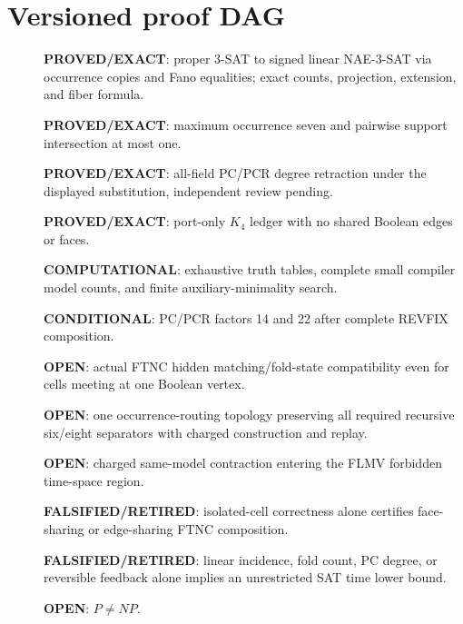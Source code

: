 \documentclass[11pt]{article}
\newcommand{\EXACT}{\textbf{PROVED/EXACT}}
\newcommand{\COMP}{\textbf{COMPUTATIONAL}}
\newcommand{\COND}{\textbf{CONDITIONAL}}
\newcommand{\OPEN}{\textbf{OPEN}}
\newcommand{\RET}{\textbf{FALSIFIED/RETIRED}}
\begin{document}
\section{Versioned proof DAG}
\begin{description}
\item[] \EXACT: proper 3-SAT to signed linear NAE-3-SAT via occurrence copies
and Fano equalities; exact counts, projection, extension, and fiber formula.
\item[] \EXACT: maximum occurrence seven and pairwise support intersection at
most one.
\item[] \EXACT: all-field PC/PCR degree retraction under the displayed
substitution, independent review pending.
\item[] \EXACT: port-only $K_4$ ledger with no shared Boolean edges or faces.
\item[] \COMP: exhaustive truth tables, complete small compiler model counts,
and finite auxiliary-minimality search.
\item[] \COND: PC/PCR factors 14 and 22 after complete REVFIX composition.
\item[] \OPEN: actual FTNC hidden matching/fold-state compatibility even for
cells meeting at one Boolean vertex.
\item[] \OPEN: one occurrence-routing topology preserving all required
recursive six/eight separators with charged construction and replay.
\item[] \OPEN: charged same-model contraction entering the FLMV forbidden
time-space region.
\item[] \RET: isolated-cell correctness alone certifies face-sharing or
edge-sharing FTNC composition.
\item[] \RET: linear incidence, fold count, PC degree, or reversible feedback
alone implies an unrestricted SAT time lower bound.
\item[] \OPEN: $P\ne NP$.
\end{description}
\end{document}

